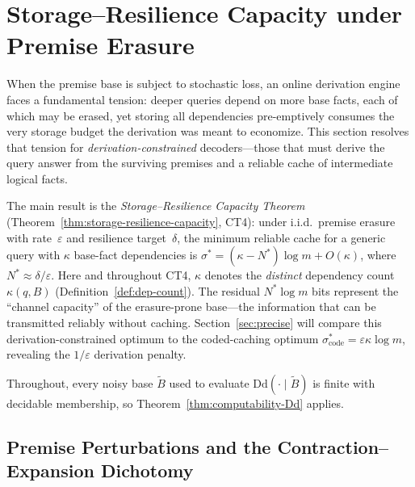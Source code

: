 \documentclass[journal]{IEEEtran}
\newcommand{\Dd}{\text{Dd}}
\numberwithin{equation}{section}
\begin{document}

\section{Storage--Resilience Capacity under Premise Erasure}
\label{sec:noise-resilience}%

When the premise base is subject to stochastic loss, an online
derivation engine faces a fundamental tension: deeper queries
depend on more base facts, each of which may be erased, yet
storing all dependencies pre-emptively consumes the very
storage budget the derivation was meant to economize.
This section resolves that tension for
\emph{derivation-constrained} decoders---those that must
derive the query answer from the surviving premises and a
reliable cache of intermediate logical facts.

The main result is the \emph{Storage--Resilience Capacity
Theorem} (Theorem~\ref{thm:storage-resilience-capacity}, CT4):
under i.i.d.\ premise erasure with rate~$\varepsilon$ and
resilience target~$\delta$, the minimum reliable cache for a
generic query with $\kappa$ base-fact dependencies is
$\sigma^*=(\kappa-N^*)\log m+O(\kappa)$,
where $N^*\approx\delta/\varepsilon$.
Here and throughout CT4, \(\kappa\) denotes the \emph{distinct} dependency count
\(\kappa(q,B)\) (Definition~\ref{def:dep-count}).
The residual $N^*\log m$ bits represent the ``channel
capacity'' of the erasure-prone base---the information that
can be transmitted reliably without caching.
Section~\ref{sec:precise} will compare this derivation-constrained
optimum to the coded-caching optimum
$\sigma^*_{\mathrm{code}}=\varepsilon\kappa\log m$, revealing
the $1/\varepsilon$ derivation penalty.

Throughout, every noisy base $\tilde B$ used to evaluate
$\Dd(\cdot\mid\tilde B)$ is finite with decidable membership, so
Theorem~\ref{thm:computability-Dd} applies.

\subsection{Premise Perturbations and the Contraction--Expansion
  Dichotomy}
\label{subsec:noisy-setup}
\end{document}
